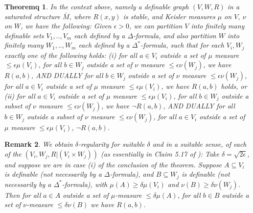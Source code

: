 \documentclass[12pt]{article}
\newtheorem{Theorem}{Theoremq}[section]
\newtheorem{Remark}[Theorem]{Remark}
\begin{document}
\begin{Theorem}  In the context above, namely a definable graph $(V,W,R)$ in a saturated structure ${\bar M}$, where $R(x,y)$ is stable, and Keisler measures $\mu$ on $V$, $\nu$ on $W$, we have the following:  Given $\epsilon > 0$,   we can partition $V$ into finitely many definable sets $V_{1},..,V_{m}$ each defined by a $\Delta$-formula,  and also partition $W$ into finitely many  $W_{1},..,W_{m}$ each defined by a $\Delta^{*}$-formula, such that for each $V_{i}, W_{j}$ exactly one of the following holds:
\newline
(i)  for all $a\in V_{i}$ outside a set of $\mu$ measure $\leq \epsilon \mu(V_{i})$, for all $b\in W_{j}$ outside a set of
$\nu$ measure $\leq \epsilon \nu(W_{j})$, we have $R(a,b)$, AND DUALLY for all $b\in W_{j}$ outside a set of
$\nu$ measure $\leq \epsilon \nu(W_{j})$, for all $a\in V_{i}$ outside a set of $\mu$ measure $\leq \epsilon \mu(V_{i})$,  we have $R(a,b)$ holds, or
\newline
(ii) for all $a\in V_{i}$ outside a set of $\mu$ measure $\leq \epsilon \mu(V_{i})$, for all $b\in W_{j}$ outside a subset of
$\nu$ measure $\leq \epsilon \nu(W_{j})$, we have $\neg R(a,b)$, AND DUALLY for all $b\in W_{j}$ outside a subset of
$\nu$ measure $\leq \epsilon \nu(W_{j})$, for all $a\in V_{i}$ outside a set of $\mu$ measure $\leq \epsilon \mu(V_{i})$, $\neg R(a,b)$. 
\end{Theorem}

\begin{Remark} We obtain $\delta$-regularity for suitable $\delta$ and in a suitable sense, of each of the $(V_{i},W_{j},R|(V_{i}\times W_{j}))$ (as essentially in Claim 5.17 of \cite{MS}):  Take 
$\delta = \sqrt{2\epsilon}$, and suppose we are in case (i) of the conclusion of the theorem. Suppose $A\subseteq V_{i}$ is definable (not necessarily 
by a $\Delta$-formula), and $B\subseteq W_{j}$ is definable (not necessarily by a $\Delta^{*}$-formula), with $\mu(A)\geq \delta\mu(V_{i})$ and 
$\nu(B) \geq \delta\nu(W_{j})$. Then  for all $a\in A$ outside a set of $\mu$-measure $\leq \delta\mu(A)$, for all $b\in B$ outside a set of $\nu$-measure $\leq \delta\nu(B)$ we have $R(a,b)$. 
\end{Remark}
\end{document}
